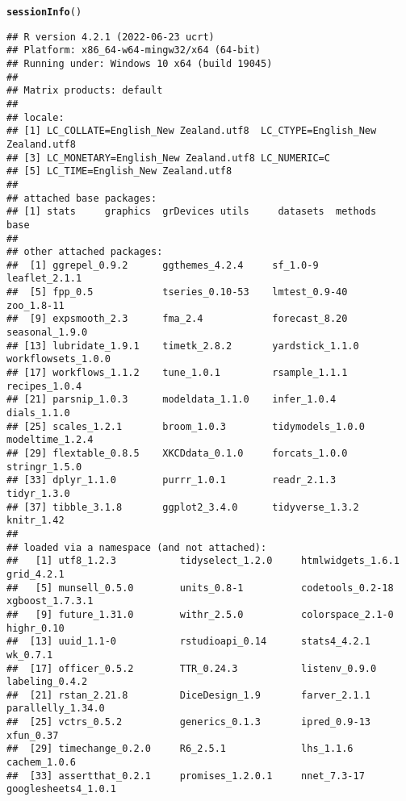 \documentclass{article}\usepackage[]{graphicx}\usepackage[]{xcolor}
\makeatletter
\newcommand{\hlstd}[1]{\textcolor[rgb]{0.345,0.345,0.345}{#1}}%
\newcommand{\hlkwd}[1]{\textcolor[rgb]{0.737,0.353,0.396}{\textbf{#1}}}%
\newenvironment{kframe}{%
 \def\at@end@of@kframe{}%
 \ifinner\ifhmode%
  \def\at@end@of@kframe{\end{minipage}}%
  \begin{minipage}{\columnwidth}%
 \fi\fi%
 \def\FrameCommand##1{\hskip\@totalleftmargin \hskip-\fboxsep
 \colorbox{shadecolor}{##1}\hskip-\fboxsep
     \hskip-\linewidth \hskip-\@totalleftmargin \hskip\columnwidth}%
 \MakeFramed {\advance\hsize-\width
   \@totalleftmargin\z@ \linewidth\hsize
   \@setminipage}}%
 {\par\unskip\endMakeFramed%
 \at@end@of@kframe}
\newenvironment{knitrout}{}{} %
\makeatother
\begin{document}
\begin{knitrout}
\color{fgcolor}\begin{kframe}
\begin{alltt}
\hlkwd{sessionInfo}\hlstd{()}
\end{alltt}
\begin{verbatim}
## R version 4.2.1 (2022-06-23 ucrt)
## Platform: x86_64-w64-mingw32/x64 (64-bit)
## Running under: Windows 10 x64 (build 19045)
## 
## Matrix products: default
## 
## locale:
## [1] LC_COLLATE=English_New Zealand.utf8  LC_CTYPE=English_New Zealand.utf8   
## [3] LC_MONETARY=English_New Zealand.utf8 LC_NUMERIC=C                        
## [5] LC_TIME=English_New Zealand.utf8    
## 
## attached base packages:
## [1] stats     graphics  grDevices utils     datasets  methods   base     
## 
## other attached packages:
##  [1] ggrepel_0.9.2      ggthemes_4.2.4     sf_1.0-9           leaflet_2.1.1     
##  [5] fpp_0.5            tseries_0.10-53    lmtest_0.9-40      zoo_1.8-11        
##  [9] expsmooth_2.3      fma_2.4            forecast_8.20      seasonal_1.9.0    
## [13] lubridate_1.9.1    timetk_2.8.2       yardstick_1.1.0    workflowsets_1.0.0
## [17] workflows_1.1.2    tune_1.0.1         rsample_1.1.1      recipes_1.0.4     
## [21] parsnip_1.0.3      modeldata_1.1.0    infer_1.0.4        dials_1.1.0       
## [25] scales_1.2.1       broom_1.0.3        tidymodels_1.0.0   modeltime_1.2.4   
## [29] flextable_0.8.5    XKCDdata_0.1.0     forcats_1.0.0      stringr_1.5.0     
## [33] dplyr_1.1.0        purrr_1.0.1        readr_2.1.3        tidyr_1.3.0       
## [37] tibble_3.1.8       ggplot2_3.4.0      tidyverse_1.3.2    knitr_1.42        
## 
## loaded via a namespace (and not attached):
##   [1] utf8_1.2.3           tidyselect_1.2.0     htmlwidgets_1.6.1    grid_4.2.1          
##   [5] munsell_0.5.0        units_0.8-1          codetools_0.2-18     xgboost_1.7.3.1     
##   [9] future_1.31.0        withr_2.5.0          colorspace_2.1-0     highr_0.10          
##  [13] uuid_1.1-0           rstudioapi_0.14      stats4_4.2.1         wk_0.7.1            
##  [17] officer_0.5.2        TTR_0.24.3           listenv_0.9.0        labeling_0.4.2      
##  [21] rstan_2.21.8         DiceDesign_1.9       farver_2.1.1         parallelly_1.34.0   
##  [25] vctrs_0.5.2          generics_0.1.3       ipred_0.9-13         xfun_0.37           
##  [29] timechange_0.2.0     R6_2.5.1             lhs_1.1.6            cachem_1.0.6        
##  [33] assertthat_0.2.1     promises_1.2.0.1     nnet_7.3-17          googlesheets4_1.0.1 

\end{verbatim}
\end{kframe}
\end{knitrout}
\end{document}
